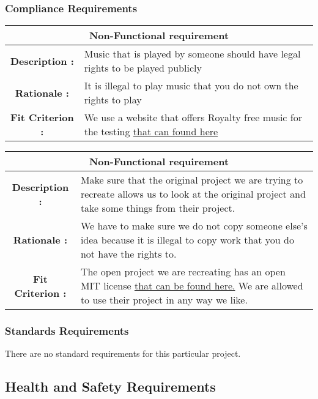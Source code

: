 \documentclass[12pt, titlepage]{article}
\begin{document}
\subsubsection{Compliance Requirements}
\begin{center}
\begin{table}[H]
\begin{tabularx}{\textwidth}{| c X |}
\hline
\multicolumn{2}{|c|}{\textbf{Non-Functional requirement}}\\
\hline
\textbf{Description : } &  Music that is played by someone should have legal rights to be played publicly \\ 
\hline 
\textbf{Rationale : } & It is illegal to play music that you do not own the rights to play \\
\hline
\textbf{Fit Criterion : } & We use a website that offers Royalty free music for the testing \href{http://www.bensound.com/}{that can found here} \\
\hline
\end{tabularx}
\end{table}

\begin{table} [H]
\begin{tabularx}{\textwidth}{| c X |}
\hline
\multicolumn{2}{|c|}{\textbf{Non-Functional requirement}}\\
\hline
\textbf{Description : } & Make sure that the original project we are trying to recreate allows us to look at the original project and take some things from their project. \\ 
\hline 
\textbf{Rationale : } & We have to make sure we do not copy someone else's idea because it is illegal to copy work that you do not have the rights to. \\
\hline
\textbf{Fit Criterion : } & The open project we are recreating has an open MIT license \href{LICENSE.txt} {that can be found here.} We are allowed to use their project in any way we like.\\
\hline
\end{tabularx}
\end{table}
\end{center}

\subsubsection{Standards Requirements}
There are no standard requirements for this particular project.

\subsection{Health and Safety Requirements}
\end{document}
